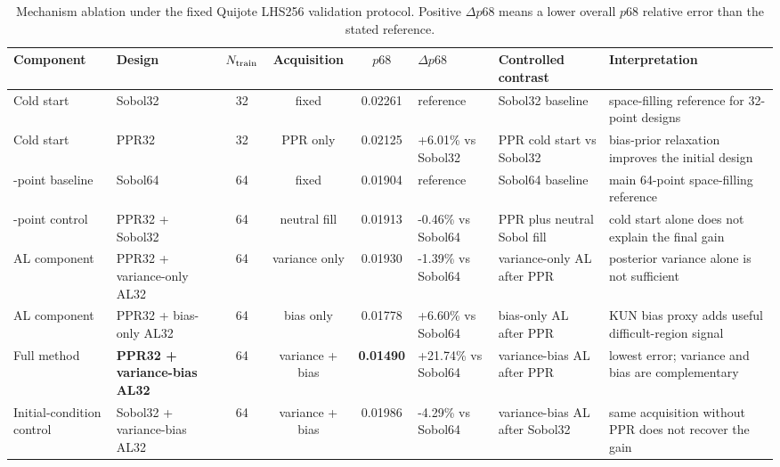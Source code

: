\begin{table}
\centering
\footnotesize
\caption{Mechanism ablation under the fixed Quijote LHS256 validation protocol. Positive \(\Delta p68\) means a lower overall \(p68\) relative error than the stated reference.}
\label{tab:mechanism_ablation}
\begin{tabularx}{\textwidth}{p{}p{}cccp{}Xp{}}
\toprule
Component & Design & \(N_{\rm train}\) & Acquisition & \(p68\) & \(\Delta p68\) & Controlled contrast & Interpretation \\
\midrule
Cold start & Sobol32 & 32 & fixed & 0.02261 & reference & Sobol32 baseline & space-filling reference for 32-point designs \\
Cold start & PPR32 & 32 & PPR only & 0.02125 & +6.01\% vs Sobol32 & PPR cold start vs Sobol32 & bias-prior relaxation improves the initial design \\
\addlinespace[2pt]
64-point baseline & Sobol64 & 64 & fixed & 0.01904 & reference & Sobol64 baseline & main 64-point space-filling reference \\
\addlinespace[2pt]
64-point control & PPR32 + Sobol32 & 64 & neutral fill & 0.01913 & -0.46\% vs Sobol64 & PPR plus neutral Sobol fill & cold start alone does not explain the final gain \\
\addlinespace[2pt]
AL component & PPR32 + variance-only AL32 & 64 & variance only & 0.01930 & -1.39\% vs Sobol64 & variance-only AL after PPR & posterior variance alone is not sufficient \\
AL component & PPR32 + bias-only AL32 & 64 & bias only & 0.01778 & +6.60\% vs Sobol64 & bias-only AL after PPR & KUN bias proxy adds useful difficult-region signal \\
\addlinespace[2pt]
Full method & \textbf{PPR32 + variance-bias AL32} & 64 & variance + bias & \textbf{0.01490} & +21.74\% vs Sobol64 & variance-bias AL after PPR & lowest error; variance and bias are complementary \\
\addlinespace[2pt]
Initial-condition control & Sobol32 + variance-bias AL32 & 64 & variance + bias & 0.01986 & -4.29\% vs Sobol64 & variance-bias AL after Sobol32 & same acquisition without PPR does not recover the gain \\
\bottomrule
\end{tabularx}
\end{table}
